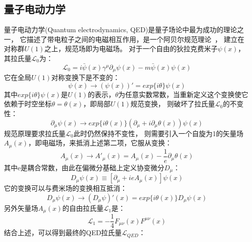 \subsection{量子电动力学}
\label{sec:QED}
量子电动力学(Quantum electrodynamics, QED)是量子场论中最为成功的理论之一，
它描述了带电粒子之间的电磁相互作用，是一个阿贝尔规范理论~\cite{GAUGE1}，
建立在对称群$U(1)$之上，规范场即为电磁场。
对于一个自由的狄拉克费米子$\psi(x)$，其拉氏量$\mathcal{L}_0$为：
\begin{equation} 
\label{eq:QED1}
\mathcal{L}_0= i \bar{\psi}(x) \gamma^{\mu} \partial_{\mu} \psi(x) - m \bar{\psi}(x) \psi(x)
\end{equation}
它在全局$U(1)$对称变换下是不变的：
\begin{equation} 
\label{eq:QED2}
\psi(x) \rightarrow (\psi(x))' = exp\{  i\theta \} \psi(x)
\end{equation}
其中$exp\{  i\theta \} \psi(x)$是$U(1)$的表示，$\theta$为任意实数常数，当重新定义这个变换使它依赖于时空坐标$\theta=\theta(x)$，即局部$U(1)$规范变换，
则破坏了拉氏量$\mathcal{L}_0$的不变性：
\begin{equation} 
\label{eq:QED3}
\partial_{\mu} \psi(x)  \rightarrow exp\{  i\theta(x) \} (\partial_{\mu} + i\partial_{\mu}\theta(x) ) \psi(x)
\end{equation}
规范原理要求拉氏量$\mathcal{L}_0$此时仍然保持不变性，
则需要引入一个自旋为1的矢量场$A_{\mu}(x)$，即电磁场，来抵消上述第二项，它服从变换：
\begin{equation} 
\label{eq:QED4}
A_{\mu}(x) \rightarrow A'_{\mu}(x) = A_{\mu}(x)- \frac{1}{e} \partial_{\mu}\theta(x)
\end{equation}
其中e是耦合常数，由此在偏微分基础上定义协变微分$D_{\mu}$：
\begin{equation} 
\label{eq:QED5}
D_{\mu}\psi(x) \equiv \left[ \partial_{\mu}+ieA_{\mu}(x) \right] \psi(x)
\end{equation}
它的变换可以与费米场的变换相互抵消：
\begin{equation} 
\label{eq:QED6}
D_{\mu}\psi(x) \rightarrow (D_{\mu}\psi)'(x)= exp\{  i\theta(x) \} D_{\mu}\psi(x)
\end{equation}
另外矢量场$A_{\mu}(x)$的自由拉氏量$\mathcal{L}_1$是：
\begin{equation} 
\label{eq:QED7}
\mathcal{L}_1=-\frac{1}{4}F_{\mu\nu}(x)F^{\mu\nu}(x)
\end{equation}
结合上述，可以得到最终的QED拉氏量$\mathcal{L}_{QED}$：
